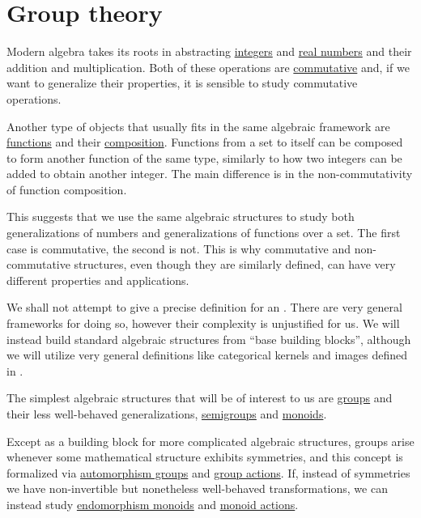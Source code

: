 \section{Group theory}\label{sec:group_theory}

Modern algebra takes its roots in abstracting \hyperref[def:set_of_integers]{integers} and \hyperref[def:set_of_real_numbers]{real numbers} and their addition and multiplication. Both of these operations are \hyperref[def:magma/commutative]{commutative} and, if we want to generalize their properties, it is sensible to study commutative operations.

Another type of objects that usually fits in the same algebraic framework are \hyperref[def:function]{functions} and their \hyperref[def:multi_valued_function/composition]{composition}. Functions from a set to itself can be composed to form another function of the same type, similarly to how two integers can be added to obtain another integer. The main difference is in the non-commutativity of function composition.

This suggests that we use the same algebraic structures to study both generalizations of numbers and generalizations of functions over a set. The first case is commutative, the second is not. This is why commutative and non-commutative structures, even though they are similarly defined, can have very different properties and applications.

We shall not attempt to give a precise definition for an . There are very general frameworks for doing so, however their complexity is unjustified for us. We will instead build standard algebraic structures from \enquote{base building blocks}, although we will utilize very general definitions like categorical kernels and images defined in .

The simplest algebraic structures that will be of interest to us are \hyperref[def:group]{groups} and their less well-behaved generalizations, \hyperref[def:magma/associative]{semigroups} and \hyperref[def:monoid]{monoids}.

Except as a building block for more complicated algebraic structures, groups arise whenever some mathematical structure exhibits symmetries, and this concept is formalized via \hyperref[def:automorphism_group]{automorphism groups} and \hyperref[def:group_action]{group actions}. If, instead of symmetries we have non-invertible but nonetheless well-behaved transformations, we can instead study \hyperref[def:endomorphism_monoid]{endomorphism monoids} and \hyperref[def:monoid_action]{monoid actions}.
